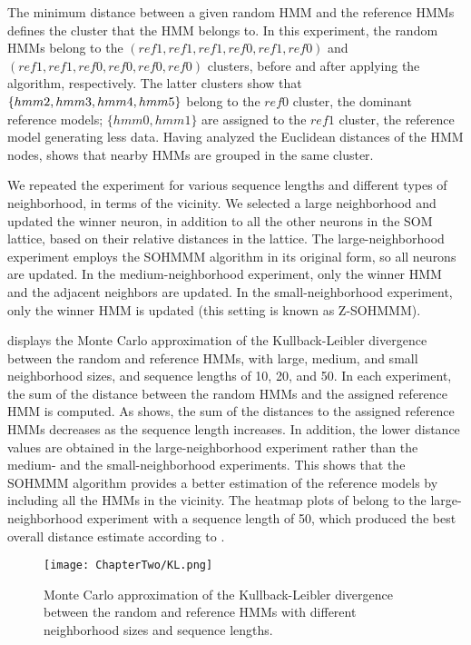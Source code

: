 The minimum distance between a given random HMM and the reference HMMs defines the cluster that the HMM belongs to. In this experiment, the random HMMs belong to the $(ref1,ref1,ref1,ref0,ref1,ref0)$ and $(ref1,ref1,ref0,ref0,ref0,ref0)$ clusters, before and after applying the algorithm, respectively. The latter clusters show that $\{hmm2,hmm3,hmm4\-,hmm5\}$ belong to the $ref0$ cluster, the dominant reference models; $\{hmm0,hmm1\}$ are assigned to the $ref1$ cluster, the reference model generating less data. Having analyzed the Euclidean distances of the HMM nodes,  shows that nearby HMMs are grouped in the same cluster. 

We repeated the experiment for various sequence lengths and different types of neighborhood, in terms of the vicinity. We selected a large neighborhood and updated the winner neuron, in addition to all the other neurons in the SOM lattice, based on their relative distances in the lattice. The large-neighborhood experiment employs the SOHMMM algorithm in its original form, so all neurons are updated. In the medium-neighborhood experiment, only the winner HMM and the adjacent neighbors are updated. In the small-neighborhood experiment, only the winner HMM is updated (this setting is known as Z-SOHMMM).

 displays the Monte Carlo approximation of the Kullback-Leibler divergence between the random and reference HMMs, with large, medium, and small neighborhood sizes, and sequence lengths of 10, 20, and 50. In each experiment, the sum of the distance between the random HMMs and the assigned reference HMM is computed. As  shows, the sum of the distances to the assigned reference HMMs decreases as the sequence length increases. In addition, the lower distance values are obtained in the large-neighborhood experiment rather than the medium- and the small-neighborhood experiments. This shows that the SOHMMM algorithm provides a better estimation of the reference models by including all the HMMs in the vicinity. The heatmap plots of  belong to the large-neighborhood experiment with a sequence length of 50, which produced the best overall distance estimate according to .

\begin{figure}[h]
	\centering
	\texttt{[image: ChapterTwo/KL.png]}
	\caption{Monte Carlo approximation of the Kullback-Leibler divergence between the random and reference HMMs with different neighborhood sizes and sequence lengths.}
	\label{fig:sohmmm_dist_neig}      
\end{figure}


